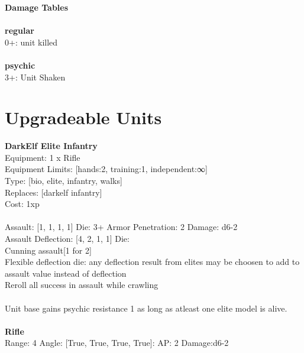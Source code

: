 {\bf Damage Tables} \\
\ \\ {\bf regular } \\
0+: unit killed \\
\ \\ {\bf psychic } \\
3+: Unit Shaken \\










\pagebreak\section{Upgradeable Units}{\bf DarkElf Elite Infantry } \\
Equipment: 1 x Rifle \\
Equipment Limits: [hands:2, training:1, independent:∞] \\
Type: [bio, elite, infantry, walks] \\
Replaces: [darkelf infantry] \\
Cost: 1xp\\
\ \\
Assault: [1, 1, 1, 1] Die: 3+ Armor Penetration: 2 Damage: d6-2 \\
Assault Deflection: [4, 2, 1, 1] Die: \\
\indent Cunning assault[1 for 2]\\ 
Flexible deflection die: any deflection result from elites may be choosen to add to assault value instead of deflection\\ 
Reroll all success in assault while crawling\\ 
 
\ \\
Unit base gains psychic resistance 1 as long as atleast one elite model is alive.\\ 

\ \\
{\bf Rifle } \\



Range: 4  Angle: [True, True, True, True]: AP: 2 Damage:d6-2 \\




 
\ \\


